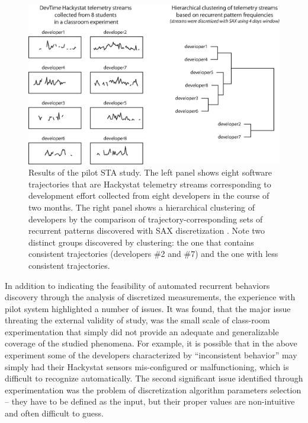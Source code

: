 \begin{figure}[t]
   \centering
   \includegraphics[width=145mm]{figures/STA1.eps}
   \caption{Results of the pilot STA study. 
   The left panel shows eight software trajectories that are Hackystat telemetry streams 
   corresponding to development effort \cite{citeulike:557296} collected from eight developers in the course of two months.
   The right panel shows a hierarchical clustering of developers by the comparison of trajectory-corresponding sets of 
   recurrent patterns discovered with SAX discretization \cite{sax}. 
   Note two distinct groups discovered by clustering: the one that contains consistent trajectories (developers \#2 and \#7) 
   and the one with less consistent trajectories.}
   \label{fig:STA1-results}
\end{figure}

In addition to indicating the feasibility of automated recurrent behaviors discovery through the analysis of discretized measurements, the experience with pilot system highlighted a number of issues. It was found, that the major issue threating the external validity of study, was the small scale of class-room experimentation that simply did not provide an adequate and generalizable coverage of the studied phenomena. For example, it is possible that in the above experiment some of the developers characterized by ``inconsistent behavior'' may simply had their Hackystat sensors mis-configured or malfunctioning, which is difficult to recognize automatically. The second significant issue identified through experimentation was the problem of discretization algorithm parameters selection -- they have to be defined as the input, but their proper values are non-intuitive and often difficult to guess.

